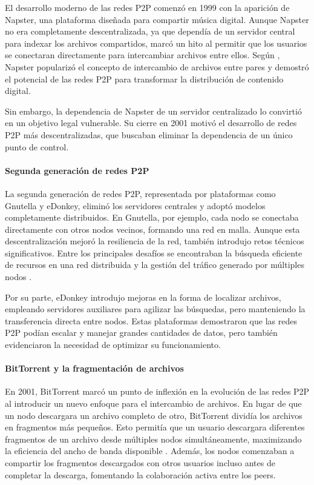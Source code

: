 El desarrollo moderno de las redes P2P comenzó en 1999 con la aparición de Napster, una plataforma diseñada para compartir música digital.
Aunque Napster no era completamente descentralizada, ya que dependía de un servidor central para indexar los archivos compartidos,
marcó un hito al permitir que los usuarios se conectaran directamente para intercambiar archivos entre ellos.
Según \cite{oram2001}, Napster popularizó el concepto de intercambio de archivos entre pares y demostró el potencial de las redes P2P para transformar la distribución de contenido digital.

Sin embargo, la dependencia de Napster de un servidor centralizado lo convirtió en un objetivo legal vulnerable.
Su cierre en 2001 motivó el desarrollo de redes P2P más descentralizadas, que buscaban eliminar la dependencia de un único punto de control.

\paragraph{Segunda generación de redes P2P}

La segunda generación de redes P2P, representada por plataformas como Gnutella y eDonkey, eliminó los servidores centrales y adoptó modelos completamente distribuidos.
En Gnutella, por ejemplo, cada nodo se conectaba directamente con otros nodos vecinos, formando una red en malla.
Aunque esta descentralización mejoró la resiliencia de la red, también introdujo retos técnicos significativos.
Entre los principales desafíos se encontraban la búsqueda eficiente de recursos en una red distribuida y la gestión del tráfico generado por múltiples nodos \cite{risson2006}.

Por su parte, eDonkey introdujo mejoras en la forma de localizar archivos, empleando servidores auxiliares para agilizar las búsquedas, pero manteniendo la transferencia directa entre nodos.
Estas plataformas demostraron que las redes P2P podían escalar y manejar grandes cantidades de datos, pero también evidenciaron la necesidad de optimizar su funcionamiento.

\paragraph{BitTorrent y la fragmentación de archivos}

En 2001, BitTorrent marcó un punto de inflexión en la evolución de las redes P2P al introducir un nuevo enfoque para el intercambio de archivos.
En lugar de que un nodo descargara un archivo completo de otro, BitTorrent dividía los archivos en fragmentos más pequeños.
Esto permitía que un usuario descargara diferentes fragmentos de un archivo desde múltiples nodos simultáneamente, maximizando la eficiencia del ancho de banda disponible \cite{cohen2003}.
Además, los nodos comenzaban a compartir los fragmentos descargados con otros usuarios incluso antes de completar la descarga, fomentando la colaboración activa entre los peers.


